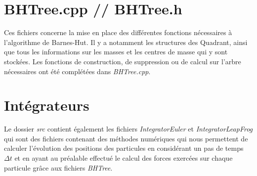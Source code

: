 \section{BHTree.cpp // BHTree.h}
Ces fichiers concerne la mise en place des différentes fonctions nécessaires à l'algorithme de Barnes-Hut. Il y a notamment les structures des Quadrant, ainsi que tous les informations sur les masses et les centres de masse qui y sont stockées. Les fonctions de construction, de suppression ou de calcul sur l'arbre nécessaires ont été complétées dans \textit{BHTree.cpp}.

\section{Intégrateurs}
Le dossier \textit{src} contient également les fichiers \textit{IntegratorEuler} et \textit{IntegratorLeapFrog} qui sont des fichiers contenant des méthodes numériques qui nous permettent de calculer l'évolution des positions des particules en considérant un pas de temps \textit{$\Delta t$} et en ayant au préalable effectué le calcul des forces exercées sur chaque particule grâce aux fichiers \textit{BHTree}.
